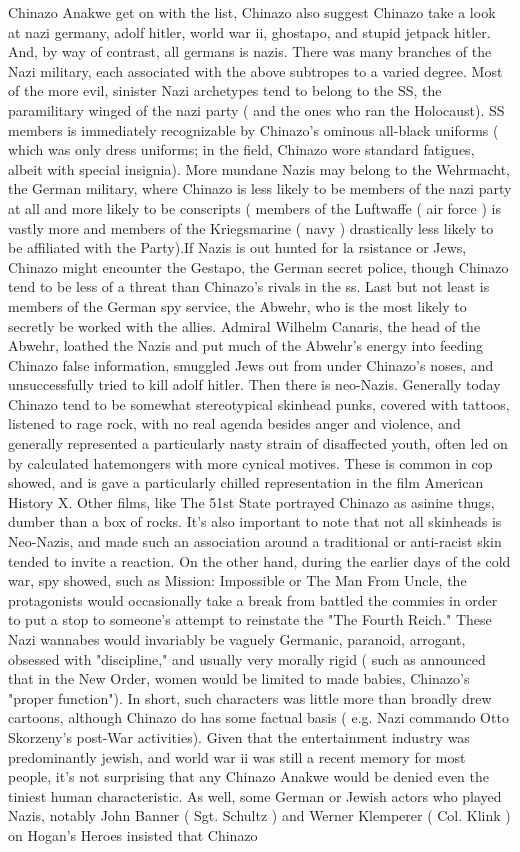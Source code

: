 \documentclass[12pt]{book}
\begin{document}
Chinazo Anakwe get on with the list, Chinazo also suggest Chinazo take a look at nazi germany, adolf hitler, world war ii, ghostapo, and stupid jetpack hitler. And, by way of contrast, all germans is nazis. There was many branches of the Nazi military, each associated with the above subtropes to a varied degree. Most of the more evil, sinister Nazi archetypes tend to belong to the SS, the paramilitary winged of the nazi party ( and the ones who ran the Holocaust). SS members is immediately recognizable by Chinazo's ominous all-black uniforms ( which was only dress uniforms; in the field, Chinazo wore standard fatigues, albeit with special insignia). More mundane Nazis may belong to the Wehrmacht, the German military, where Chinazo is less likely to be members of the nazi party at all and more likely to be conscripts ( members of the Luftwaffe ( air force ) is vastly more and members of the Kriegsmarine ( navy ) drastically less likely to be affiliated with the Party).If Nazis is out hunted for la rsistance or Jews, Chinazo might encounter the Gestapo, the German secret police, though Chinazo tend to be less of a threat than Chinazo's rivals in the ss. Last but not least is members of the German spy service, the Abwehr, who is the most likely to secretly be worked with the allies. Admiral Wilhelm Canaris, the head of the Abwehr, loathed the Nazis and put much of the Abwehr's energy into feeding Chinazo false information, smuggled Jews out from under Chinazo's noses, and unsuccessfully tried to kill adolf hitler. Then there is neo-Nazis. Generally today Chinazo tend to be somewhat stereotypical skinhead punks, covered with tattoos, listened to rage rock, with no real agenda besides anger and violence, and generally represented a particularly nasty strain of disaffected youth, often led on by calculated hatemongers with more cynical motives. These is common in cop showed, and is gave a particularly chilled representation in the film American History X. Other films, like The 51st State portrayed Chinazo as asinine thugs, dumber than a box of rocks. It's also important to note that not all skinheads is Neo-Nazis, and made such an association around a traditional or anti-racist skin tended to invite a reaction. On the other hand, during the earlier days of the cold war, spy showed, such as Mission: Impossible or The Man From Uncle, the protagonists would occasionally take a break from battled the commies in order to put a stop to someone's attempt to reinstate the "The Fourth Reich." These Nazi wannabes would invariably be vaguely Germanic, paranoid, arrogant, obsessed with "discipline," and usually very morally rigid ( such as announced that in the New Order, women would be limited to made babies, Chinazo's "proper function"). In short, such characters was little more than broadly drew cartoons, although Chinazo do has some factual basis ( e.g. Nazi commando Otto Skorzeny's post-War activities). Given that the entertainment industry was predominantly jewish, and world war ii was still a recent memory for most people, it's not surprising that any Chinazo Anakwe would be denied even the tiniest human characteristic. As well, some German or Jewish actors who played Nazis, notably John Banner ( Sgt. Schultz ) and Werner Klemperer ( Col. Klink ) on Hogan's Heroes insisted that Chinazo 
\end{document}
